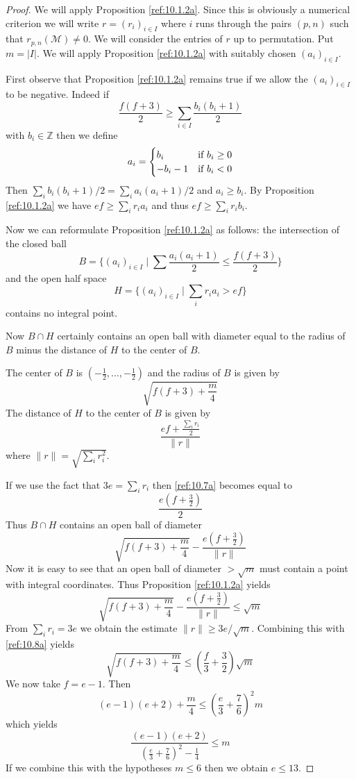 \documentclass{amsproc}
\def \ZZ{{\mathbb Z}}
\def\Mscr{{\mathcal M}}
\let\oldtext\text
\def\text#1{\oldtext{\upshape #1}}
\theoremstyle{definition}
\theoremstyle{remark}
\numberwithin{equation}{section}
\numberwithin{table}{section}
\numberwithin{figure}{section}
\begin{document}
\begin{proof}
  We will apply Proposition \ref{ref:10.1.2a}. Since this is
  obviously a numerical criterion we will write $r=(r_i)_{i\in I}$
  where $i$ runs through the pairs $(p,n)$ such that
  $r_{p,n}(\Mscr)\neq 0$. We will consider the entries of $r$ up to
  permutation. Put $m=|I|$.  We will apply Proposition
  \ref{ref:10.1.2a} with suitably chosen $(a_i)_{i\in I}$.
  
  First observe that Proposition \ref{ref:10.1.2a} remains true if
  we allow the $(a_i)_{i\in I}$ to be negative. Indeed if
\[
\frac{f(f+3)}{2}\ge \sum_{i\in I} \frac{b_i(b_i+1)}{2}
\]
with $b_i\in \ZZ$ then we define
\[
a_i=
\begin{cases}
b_i&\text{if $b_i\ge 0$}\\
-b_i-1&\text{if $b_i<0$}
\end{cases}
\]
Then $\sum_i b_i(b_i+1)/2=\sum_i a_i(a_i+1)/2$ and $a_i\ge b_i$. By 
Proposition \ref{ref:10.1.2a} we have $ef\ge \sum_i r_i a_i$ and thus $ef\ge \sum_i 
r_i b_i$.  

Now we can reformulate Proposition \ref{ref:10.1.2a} as follows:
the intersection of the closed ball
\[
B=\{(a_i)_{i\in I}\mid \sum \frac{a_i(a_i+1)}{2} \le
\frac{f(f+3)}{2}\}
\]
and the open half space 
\[
H=\{(a_i)_{i\in I}\mid \sum_i r_i a_i > ef\}
\]
contains no integral point. 

Now $B\cap H$ certainly contains an open ball with diameter equal to
the radius of $B$ minus the distance of $H$ to the center of $B$. 

The center of $B$ is $(-\frac{1}{2},\ldots,-\frac{1}{2})$ and the radius of $B$
is given by
\[
\sqrt{f(f+3)+\frac{m}{4}}
\]
The distance of $H$ to the center of $B$ is given by
\begin{equation}
\label{ref:10.7a}
\frac{ef+\frac{\sum_i r_i}{2}}{\|r\|}
\end{equation}
where $\|r\|=\sqrt{\sum_i r^2_i}$.

If we use the fact that $3e=\sum_i r_i$ then \eqref{ref:10.7a} becomes
equal to 
\[
\frac{e(f+\frac{3}{2})}{2}
\]
Thus $B\cap H$ contains an open ball of diameter
\[
\sqrt{f(f+3)+\frac{m}{4}}-
\frac{e(f+\frac{3}{2})}{\|r\|}
\]
Now it is easy to see that an open  ball of diameter $>\sqrt{m}$ must contain
a point with integral coordinates. Thus Proposition \ref{ref:10.1.2a} yields
\begin{equation}
\label{ref:10.8a}
\sqrt{f(f+3)+\frac{m}{4}}-
\frac{e(f+\frac{3}{2})}{\|r\|}\le\sqrt{m}
\end{equation}
From $\sum_i r_i=3e$ we obtain the estimate $\|r\|\ge
3e/\sqrt{m}$. Combining this with \eqref{ref:10.8a} yields 
\[
\sqrt{f(f+3)+\frac{m}{4}}\le\left( 
   \frac{f}{3}+\frac{3}{2}\right)\sqrt{m} 
\]
We now take $f=e-1$. Then
\[
(e-1)(e+2)+\frac{m}{4}\le
\left( \frac{e}{3}+\frac{7}{6}\right)^2m
\]
which yields 
\[
\frac{(e-1)(e+2)}{
\left(
 \frac{e}{3}+\frac{7}{6}
\right)^2
-
\frac{1}{4}}
\le m
\]
If we combine this with the hypotheses $m\le 6$ then we obtain $e\le
13$.


\end{proof}
\end{document}

